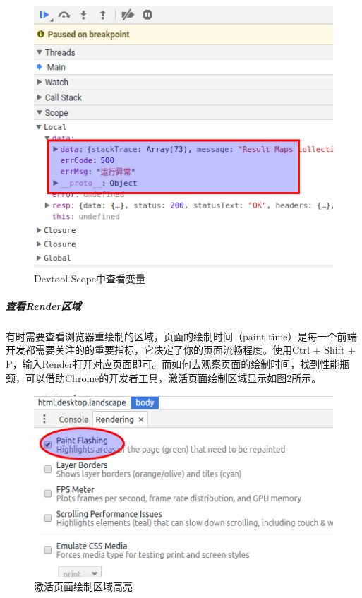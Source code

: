 \documentclass[12pt]{book}
\numberwithin{dummy}{section}
\theoremstyle{ocrenumbox}
\theoremstyle{blacknumex}
\theoremstyle{blacknumbox}
\theoremstyle{ocrenum}
\begin{document}
\begin{figure}[htbp]
	\centering
	\includegraphics[scale=0.4]{sourcepanelscopevariable.png}
	\caption{Devtool Scope中查看变量}
	\label{fig:sourcepanelscopevariable}
\end{figure}




\subparagraph{查看Render区域}

有时需要查看浏览器重绘制的区域，页面的绘制时间（paint time）是每一个前端开发都需要关注的的重要指标，它决定了你的页面流畅程度。使用Ctrl + Shift + P，输入Render打开对应页面即可。而如何去观察页面的绘制时间，找到性能瓶颈，可以借助Chrome的开发者工具，激活页面绘制区域显示如图\ref{fig:pagepainting}所示。

\begin{figure}[htbp]
	\centering
	\includegraphics[scale=0.6]{pagepainting.png}
	\caption{激活页面绘制区域高亮}
	\label{fig:pagepainting}
\end{figure}
\end{document}
